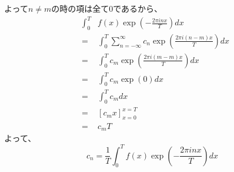 \documentclass[a4paper]{jsarticle}
\begin{document}
よって$ n \neq m $の時の項は全て$0$であるから、
\begin{eqnarray}
	& \int _0 ^T & f \left( x \right) \exp \left( - \frac { 2 \pi inx } { T } \right) dx \nonumber \\
	&=& \int _0 ^T \sum _{ n = - \infty } ^\infty c_n \exp \left( \frac { 2 \pi i \left( n - m \right) x } { T } \right) dx \nonumber \\
	&=& \int _0 ^T c_m \exp \left( \frac { 2 \pi i \left( m - m \right) x } { T } \right) dx \nonumber \\
	&=& \int _0 ^T c_m \exp \left( 0 \right) dx \nonumber \\
	&=& \int _0 ^T c_m dx \nonumber \\
	&=& \left[ c_m x \right] _{ x = 0 } ^{ x = T } \nonumber \\
	&=& c_m T
\end{eqnarray}
よって、
\begin{equation}
c_n = \frac { 1 } { T } \int _0 ^T f \left( x \right) \exp \left( - \frac { 2 \pi inx } { T } \right) dx
\end{equation}
\end{document}
